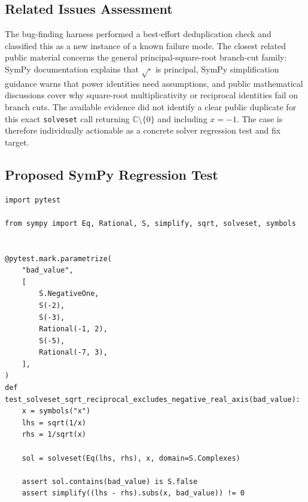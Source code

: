 \documentclass[11pt]{article}
\begin{document}
\subsection{Related Issues Assessment}

The bug-finding harness performed a best-effort deduplication check and classified this as a new instance of a known failure mode. The closest related public material concerns the general principal-square-root branch-cut family: SymPy documentation explains that \(\sqrt{\cdot}\) is principal, SymPy simplification guidance warns that power identities need assumptions, and public mathematical discussions cover why square-root multiplicativity or reciprocal identities fail on branch cuts. The available evidence did not identify a clear public duplicate for this exact \texttt{solveset} call returning \(\mathbb{C}\setminus\{0\}\) and including \(x=-1\). The case is therefore individually actionable as a concrete solver regression test and fix target.

\subsection{Proposed SymPy Regression Test}

\medskip

\begin{lstlisting}[style=bugpython]
import pytest

from sympy import Eq, Rational, S, simplify, sqrt, solveset, symbols


@pytest.mark.parametrize(
    "bad_value",
    [
        S.NegativeOne,
        S(-2),
        S(-3),
        Rational(-1, 2),
        S(-5),
        Rational(-7, 3),
    ],
)
def test_solveset_sqrt_reciprocal_excludes_negative_real_axis(bad_value):
    x = symbols("x")
    lhs = sqrt(1/x)
    rhs = 1/sqrt(x)

    sol = solveset(Eq(lhs, rhs), x, domain=S.Complexes)

    assert sol.contains(bad_value) is S.false
    assert simplify((lhs - rhs).subs(x, bad_value)) != 0
\end{lstlisting}
\end{document}
